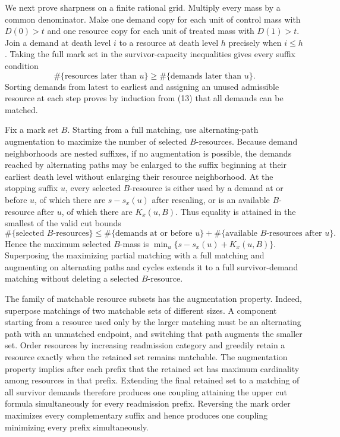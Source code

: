 We next prove sharpness on a finite rational grid.  Multiply every mass by a common denominator.  Make one demand copy for each unit of control mass with \(D(0)>t\) and one resource copy for each unit of treated mass with \(D(1)>t\).  Join a demand at death level \(i\) to a resource at death level \(h\) precisely when \(i\leq h\).  Taking the full mark set in the survivor-capacity inequalities gives every suffix condition
\[
\#\{\text{resources later than }u\}
\geq\#\{\text{demands later than }u\}.                              \tag{13}
\]
Sorting demands from latest to earliest and assigning an unused admissible resource at each step proves by induction from (13) that all demands can be matched.

Fix a mark set \(B\).  Starting from a full matching, use alternating-path augmentation to maximize the number of selected \(B\)-resources.  Because demand neighborhoods are nested suffixes, if no augmentation is possible, the demands reached by alternating paths may be enlarged to the suffix beginning at their earliest death level without enlarging their resource neighborhood.  At the stopping suffix \(u\), every selected \(B\)-resource is either used by a demand at or before \(u\), of which there are \(s-s_x(u)\) after rescaling, or is an available \(B\)-resource after \(u\), of which there are \(K_x(u,B)\).  Thus equality is attained in the smallest of the valid cut bounds
\[
\#\{\text{selected \(B\)-resources}\}
\leq\#\{\text{demands at or before }u\}
 +\#\{\text{available \(B\)-resources after }u\}.                 \tag{14}
\]
Hence the maximum selected \(B\)-mass is \(\min_u\{s-s_x(u)+K_x(u,B)\}\).  Superposing the maximizing partial matching with a full matching and augmenting on alternating paths and cycles extends it to a full survivor-demand matching without deleting a selected \(B\)-resource.

The family of matchable resource subsets has the augmentation property.  Indeed, superpose matchings of two matchable sets of different sizes.  A component starting from a resource used only by the larger matching must be an alternating path with an unmatched endpoint, and switching that path augments the smaller set.  Order resources by increasing readmission category and greedily retain a resource exactly when the retained set remains matchable.  The augmentation property implies after each prefix that the retained set has maximum cardinality among resources in that prefix.  Extending the final retained set to a matching of all survivor demands therefore produces one coupling attaining the upper cut formula simultaneously for every readmission prefix.  Reversing the mark order maximizes every complementary suffix and hence produces one coupling minimizing every prefix simultaneously.


